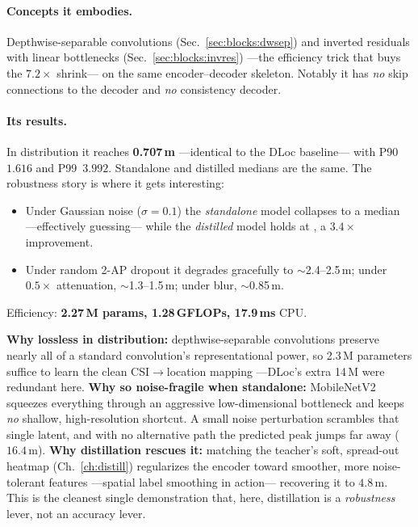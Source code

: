 \paragraph{Concepts it embodies.} Depthwise-separable convolutions
(Sec.~\ref{sec:blocks:dwsep}) and inverted residuals with linear bottlenecks
(Sec.~\ref{sec:blocks:invres}) ---the efficiency trick that buys the $7.2\times$ shrink--- on the same
encoder--decoder skeleton. Notably it has \emph{no} skip connections to the decoder and \emph{no}
consistency decoder.

\paragraph{Its results.} In distribution it reaches \textbf{0.707\,m} ---identical to the DLoc
baseline--- with P90~$1.616$ and P99~$3.992$. Standalone and distilled medians are the same. The
robustness story is where it gets interesting:
\begin{itemize}[leftmargin=1.4em,nosep]
  \item Under Gaussian noise ($\sigma{=}0.1$) the \emph{standalone} model collapses to a
   median ---effectively guessing--- while the \emph{distilled} model holds at
  , a $\mathbf{3.4\times}$ improvement.
  \item Under random 2-AP dropout it degrades gracefully to $\sim$2.4--2.5\,m; under $0.5\times$
  attenuation, $\sim$1.3--1.5\,m; under blur, $\sim$0.85\,m.
\end{itemize}
Efficiency: \textbf{2.27\,M params, 1.28\,GFLOPs, 17.9\,ms} CPU.

\begin{whybox}
\textbf{Why lossless in distribution:} depthwise-separable convolutions preserve nearly all of a
standard convolution's representational power, so 2.3\,M parameters suffice to learn the clean
CSI$\to$location mapping ---DLoc's extra 14\,M were redundant here. \textbf{Why so noise-fragile when
standalone:} MobileNetV2 squeezes everything through an aggressive low-dimensional bottleneck and
keeps \emph{no} shallow, high-resolution shortcut. A small noise perturbation scrambles that single
latent, and with no alternative path the predicted peak jumps far away ($16.4$\,m). \textbf{Why
distillation rescues it:} matching the teacher's soft, spread-out heatmap (Ch.~\ref{ch:distill})
regularizes the encoder toward smoother, more noise-tolerant features ---spatial label smoothing in
action--- recovering it to $4.8$\,m. This is the cleanest single demonstration that, here, distillation
is a \emph{robustness} lever, not an accuracy lever.
\end{whybox}


